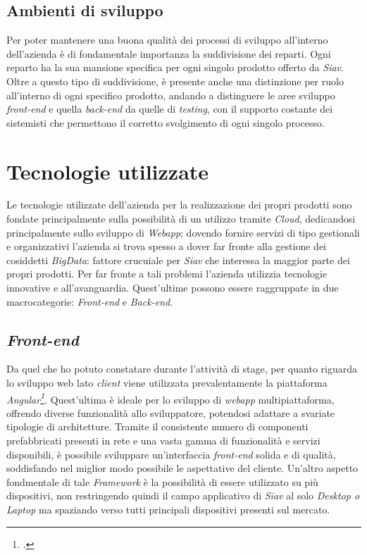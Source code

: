 \subsection{Ambienti di sviluppo}
Per poter mantenere una buona qualità dei processi di sviluppo all'interno dell'azienda è di fondamentale importanza la suddivisione dei reparti. Ogni reparto ha la sua mansione specifica per ogni singolo prodotto offerto da \textit{Siav}. Oltre a questo tipo di suddivisione, è presente anche una distinzione per ruolo all'interno di ogni specifico prodotto, andando a distinguere le aree sviluppo \textit{front-end} e quella \textit{back-end} da quelle di \textit{testing}, con il supporto costante dei sistemisti che permettono il corretto svolgimento di ogni singolo processo.
\section {Tecnologie utilizzate}
Le tecnologie utilizzate dell'azienda per la realizzazione dei propri prodotti sono fondate principalmente sulla possibilità di un utilizzo tramite \textit{\gls{Cloud}}, dedicandosi principalmente sullo sviluppo di \textit{Webapp}; dovendo fornire servizi di tipo gestionali e organizzativi l'azienda si trova spesso a dover far fronte alla gestione dei cosiddetti \textit{\gls{BigData}}: fattore crucuiale per \textit{Siav} che interessa la maggior parte dei propri prodotti. Per far fronte a tali problemi l'azienda utilizzia tecnologie innovative e all'avanguardia. Quest'ultime possono essere raggruppate in due macrocategorie: \textit{Front-end} e \textit{Back-end}.
\subsection{\textit{Front-end}}
Da quel che ho potuto constatare durante l'attività di stage, per quanto riguarda lo sviluppo web lato \textit{client} viene utilizzata prevalentamente la piattaforma \textit{\gls{Angular}\footcite{Angular: https://angular.io/}}.
Quest'ultima è ideale per lo sviluppo di \textit{webapp} multipiattaforma, offrendo diverse funzionalità allo sviluppatore, potendosi adattare a svariate tipologie di architetture.
 Tramite il consistente numero di componenti prefabbricati presenti in rete e una vasta gamma di funzionalità e servizi disponibili, è possibile sviluppare un'interfaccia \textit{front-end} solida e di qualità, soddisfando nel miglior modo possibile le aspettative del cliente. Un'altro aspetto fondmentale di tale \textit{\gls{Framework}} è la possibilità di essere utilizzato su più dispositivi, non restringendo quindi il campo applicativo di \textit{Siav} al solo \textit{Desktop o Laptop} ma spaziando verso tutti principali dispositivi presenti sul mercato.
